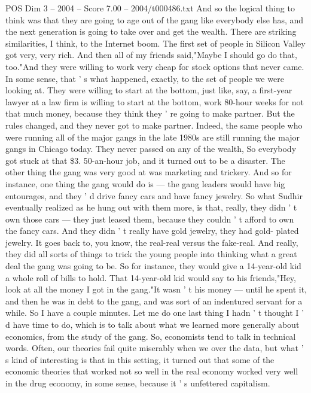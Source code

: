 \begin{textsample}{POS Dim 3 – 2004 – Score 7.00 – 2004/t000486.txt}
And so the logical thing to think was that they are going to age out of the gang like everybody else has, and the next generation is going to take over and get the wealth.
There are striking similarities, I think, to the Internet boom.
The first set of people in Silicon Valley got very, very rich.
And then all of my friends said,"Maybe I should go do that, too."And they were willing to work very cheap for stock options that never came.
In some sense, that ' s what happened, exactly, to the set of people we were looking at.
They were willing to start at the bottom, just like, say, a first-year lawyer at a law firm is willing to start at the bottom, work 80-hour weeks for not that much money, because they think they ' re going to make partner.
But the rules changed, and they never got to make partner.
Indeed, the same people who were running all of the major gangs in the late 1980s are still running the major gangs in Chicago today.
They never passed on any of the wealth, So everybody got stuck at that \$3. 50-an-hour job, and it turned out to be a disaster.
The other thing the gang was very good at was marketing and trickery.
And so for instance, one thing the gang would do is — the gang leaders would have big entourages, and they ' d drive fancy cars and have fancy jewelry.
So what Sudhir eventually realized as he hung out with them more, is that, really, they didn ' t own those cars — they just leased them, because they couldn ' t afford to own the fancy cars.
And they didn ' t really have gold jewelry, they had gold- plated jewelry.
It goes back to, you know, the real-real versus the fake-real.
And really, they did all sorts of things to trick the young people into thinking what a great deal the gang was going to be.
So for instance, they would give a 14-year-old kid a whole roll of bills to hold.
That 14-year-old kid would say to his friends,"Hey, look at all the money I got in the gang."It wasn ' t his money — until he spent it, and then he was in debt to the gang, and was sort of an indentured servant for a while.
So I have a couple minutes.
Let me do one last thing I hadn ' t thought I ' d have time to do, which is to talk about what we learned more generally about economics, from the study of the gang.
So, economists tend to talk in technical words.
Often, our theories fail quite miserably when we over the data, but what ' s kind of interesting is that in this setting, it turned out that some of the economic theories that worked not so well in the real economy worked very well in the drug economy, in some sense, because it ' s unfettered capitalism.

\end{textsample}
